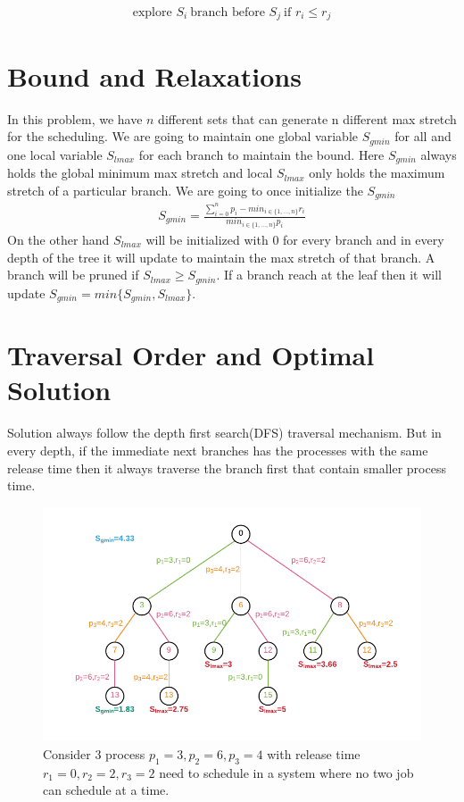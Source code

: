 \documentclass[11pt, conference, onecolumn]{IEEEtran}
\begin{document}
\begin{equation*}
\begin{array}{l}
\text{explore }S_i \ \text{branch before } S_j\ \text{if }  r_{i}\leq r_{j} 
\end{array}
\end{equation*}

\section{Bound and Relaxations}
In this problem, we have $n$ different sets that can generate n different max stretch for the scheduling. We are going to maintain 
one global variable $S_{gmin}$ for all and one local variable $S_{lmax}$ for each branch to maintain the bound. 
Here $S_{gmin}$  always holds the global minimum max stretch and local $S_{lmax}$ only holds the maximum stretch 
of a particular branch.
We are going to once initialize the $S_{gmin}$
\begin{equation*}
\begin{array}{l}
S_{gmin} = \frac{\sum_{i=0}^{n}p_i - min_{i\in\{1,\dots,n\}}r_i}{min_{i\in\{1,\dots,n\}}p_i}
\end{array}
\end{equation*}
On the other hand $S_{lmax}$ will be initialized with $0$ for every branch and in every depth of the tree it will update to maintain the 
max stretch of that branch. A branch will be pruned if $S_{lmax}\geq S_{gmin}$.  If a branch reach at the leaf then it will update 
$S_{gmin} = min\{S_{gmin}, S_{lmax}\}$. 

\section{Traversal Order and Optimal Solution}
Solution always follow the depth first search(DFS) traversal mechanism. But in every depth, if the immediate next branches has the processes 
with the same release time then it always traverse the branch first that contain smaller process time. 
\begin{figure}
\centering
\includegraphics[width=0.96\linewidth]{schedule.pdf}
\caption{Consider 3 process $p_1=3,p_2=6,p_3=4$ with release time $r_1=0,r_2=2,r_3=2$ need to schedule in a system where no two job can schedule at  a time.}
\end{figure}
\end{document}
